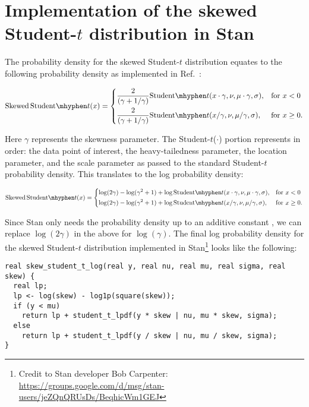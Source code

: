 \documentclass[12pt]{article}
\begin{document}
\section{Implementation of the skewed Student-$t$ distribution in Stan}

The probability density for the skewed Student-$t$ distribution
\cite{fernandez1998} equates to the following probability density as
implemented in Ref.~\cite{king2012}:

\begin{equation}
  \mathrm{Skewed\,Student}\mhyphen t(x) =
\begin{dcases}
\frac{2}{(\gamma + 1/\gamma)}
         \mathrm{Student}\mhyphen t(x \cdot \gamma, \nu, \mu \cdot \gamma, \sigma),& \text{for } x < 0\\
       \frac{2}{(\gamma + 1/\gamma)}
         \mathrm{Student}\mhyphen t(x / \gamma, \nu, \mu / \gamma, \sigma),& \text{for } x \ge 0.
\end{dcases}
\end{equation}

Here $\gamma$ represents the skewness parameter. The Student-$t$($\cdot$) portion
represents in order: the data point of interest, the heavy-tailedness
parameter, the location parameter, and the scale parameter as passed to the
standard Student-$t$ probability density. This translates to the log probability
density:

\begin{equation}
\mathrm{Skewed\,Student}\mhyphen t(x) =
\begin{dcases}
  \log (2 \gamma) - \log(\gamma^2 + 1) +
  \log \mathrm{Student}\mhyphen t(x \cdot \gamma, \nu, \mu \cdot \gamma, \sigma),& \text{for } x < 0\\
  \log (2 \gamma) - \log(\gamma^2 + 1) +
  \log \mathrm{Student}\mhyphen t(x / \gamma, \nu, \mu / \gamma, \sigma),& \text{for } x \ge 0.
\end{dcases}
\end{equation}

Since Stan only needs the probability density up to an additive
constant \cite{stan-manual2014}, we
can replace $\log(2 \gamma)$ in the above for $\log(\gamma)$. The final log
probability density for the skewed Student-$t$ distribution implemented in
Stan\footnote{Credit to Stan developer Bob Carpenter:\\
\url{https://groups.google.com/d/msg/stan-users/jeZQnQRUsDs/BeqhicWm1GEJ}}
looks like the following:

\begin{verbatim}
real skew_student_t_log(real y, real nu, real mu, real sigma, real skew) {
  real lp;
  lp <- log(skew) - log1p(square(skew));
  if (y < mu)
    return lp + student_t_lpdf(y * skew | nu, mu * skew, sigma);
  else
    return lp + student_t_lpdf(y / skew | nu, mu / skew, sigma);
}
\end{verbatim}
\end{document}
